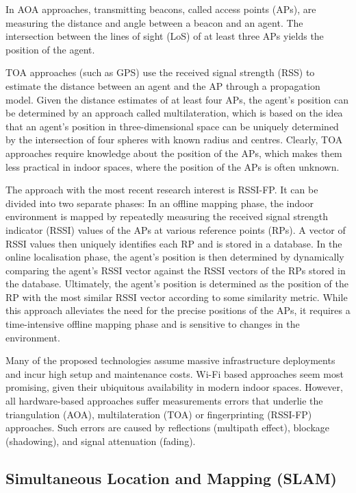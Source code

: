 \documentclass[a4paper]{article}
\begin{document}
  In AOA approaches, transmitting beacons, called access points (APs), are
  measuring the distance and angle between a beacon and an agent. The
  intersection between the lines of sight (LoS) of at least three APs yields
  the position of the agent. 

  TOA approaches (such as GPS) use the received signal strength (RSS) to
  estimate the distance between an agent and the AP through a propagation model.
  Given the distance estimates of at least four APs, the agent's position can be
  determined by an approach called multilateration, which is based on the idea
  that an agent's position in three-dimensional space can be uniquely determined
  by the intersection of four spheres with known radius and centres. Clearly,
  TOA approaches require knowledge about the position of the APs, which makes
  them less practical in indoor spaces, where the position of the APs is often
  unknown.

  The approach with the most recent research interest is RSSI-FP. It can be
  divided into two separate phases: In an offline mapping phase, the indoor
  environment is mapped by repeatedly measuring the received signal strength
  indicator (RSSI) values of the APs at various reference points (RPs). A vector
  of RSSI values then uniquely identifies each RP and is stored in a database.
  In the online localisation phase, the agent's position is then determined by
  dynamically comparing the agent's RSSI vector against the RSSI vectors of the
  RPs stored in the database. Ultimately, the agent's position is determined as
  the position of the RP with the most similar RSSI vector according to some
  similarity metric. While this approach alleviates the need for the precise
  positions of the APs, it requires a time-intensive offline mapping phase and
  is sensitive to changes in the environment.

  Many of the proposed technologies assume massive infrastructure deployments
  and incur high setup and maintenance costs. Wi-Fi based approaches seem most
  promising, given their ubiquitous availability in modern indoor spaces.
  However, all hardware-based approaches suffer measurements errors that
  underlie the triangulation (AOA), multilateration (TOA) or fingerprinting
  (RSSI-FP) approaches. Such errors are caused by reflections (multipath
  effect), blockage (shadowing), and signal attenuation (fading).


  \subsection{Simultaneous Location and Mapping (SLAM)} %
\end{document}
